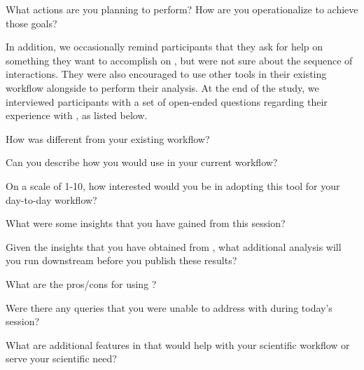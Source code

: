 {\begin{denselist}
    \item What actions are you planning to perform? How are you operationalize to achieve those goals?
   \end{denselist}
   In addition, we occasionally remind participants that they ask for help on something they want to accomplish on \zvpp, but were not sure about the sequence of interactions. They were also encouraged to use other tools in their existing workflow alongside \zvpp to perform their analysis. 
   \npar At the end of the study, we interviewed participants with a set of open-ended questions regarding their experience with \zvpp, as listed below.
   \begin{denselist}
     \item How was \zvpp different from your existing workflow? 
     \item Can you describe how you would use \zvpp in your current workflow?
     \item On a scale of 1-10, how interested would you be in adopting this tool for your day-to-day workflow?
     \item What were some insights that you have gained from this session?
     \item Given the insights that you have obtained from \zvpp, what additional analysis will you run downstream before you publish these results? 
     \item What are the pros/cons for using \zvpp?
     \item Were there any queries that you were unable to address with \zvpp during today's session?
     \item What are additional features in \zvpp that would help with your scientific workflow or serve your scientific need?
   \end{denselist}
}
\clearpage

